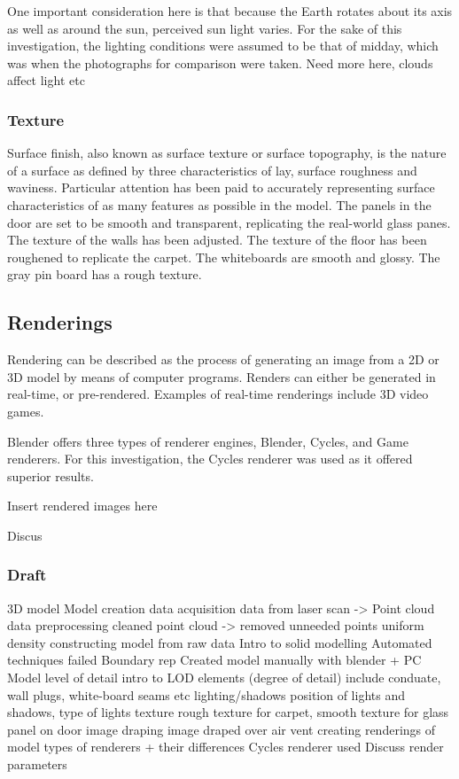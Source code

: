 \documentclass[11pt,a4paper]{report}
\begin{document}
						One important consideration here is that because the Earth rotates about its axis as well as around the sun, perceived sun light varies. For the sake of this investigation, the lighting conditions were assumed to be that of midday, which was when the photographs for comparison were taken. {{Need more here, clouds affect light etc}}
						
				\subsubsection{Texture}
					Surface finish, also known as surface texture or surface topography, is the nature of a surface as defined by three characteristics of lay, surface roughness and waviness.
					\cite{e._paul_degarmo_materials_2003}
					Particular attention has been paid to accurately representing surface characteristics of as many features as possible in the model.
					The panels in the door are set to be smooth and transparent, replicating the real-world glass panes. 
					The texture of the walls has been adjusted.
					The texture of the floor has been roughened to replicate the carpet.
					The whiteboards are smooth and glossy.
					The gray pin board has a rough texture.
			
			\subsection{Renderings}
				Rendering can be described as the process of generating an image from a 2D or 3D model by means of computer programs. Renders can either be generated in real-time, or pre-rendered. Examples of real-time renderings include 3D video games.
				
				Blender offers three types of renderer engines, Blender, Cycles, and Game renderers. For this investigation, the Cycles renderer was used as it offered superior results.
				
				{{Insert rendered images here}} 
				
				Discus 
			
			\subsubsection{Draft}
				3D model
					Model creation
						data acquisition
							data from laser scan -> Point cloud
						data preprocessing
							cleaned point cloud -> removed unneeded points
							uniform density
						constructing model from raw data
							Intro to solid modelling
							Automated techniques failed
							Boundary rep
							Created model manually with blender + PC
					Model level of detail
						intro to LOD
						elements (degree of detail)
							include conduate, wall plugs, white-board seams etc
						lighting/shadows
							position of lights and shadows, type of lights
						texture
							rough texture for carpet, smooth texture for glass panel on door
						image draping
							image draped over air vent
					creating renderings of model
						types of renderers + their differences
						Cycles renderer used
						Discuss render parameters
			
\end{document}
